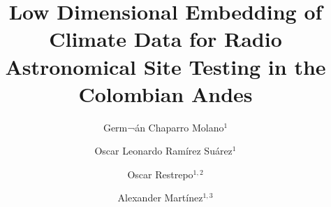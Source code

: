 \documentclass[12pt]{iopart}
\begin{document}

\title[Low Dimensional Embedding of Climate Data for Radio Astronomical Site Testing]{Low Dimensional Embedding of Climate Data for Radio Astronomical Site Testing in the Colombian Andes}

\author{Germ¬\'an Chaparro Molano$^{1}$}
\address{$^1$Grupo de Simulaci\'on, An\'alisis y Modelado, Vicerrector\'ia de Investigaci\'on, Universidad ECCI, Bogot\'a, Colombia}
\author{Oscar Leonardo Ram\'irez Su\'arez$^{1}$}
\address{$^1$Grupo de Simulaci\'on, An\'alisis y Modelado, Vicerrector\'ia de Investigaci\'on, Universidad ECCI, Bogot\'a, Colombia}
\author{Oscar Restrepo$^{1,2}$}
\address{$^1$Grupo de Simulaci\'on, An\'alisis y Modelado, Vicerrector\'ia de Investigaci\'on, Universidad ECCI, Bogot\'a, Colombia}
\address{$^2$Radio Astronomy Instrumentation Group, Universidad de Chile, Santiago de Chile, Chile}
\author{Alexander Mart\'inez$^{1,3}$}
\address{$^1$Grupo de Simulaci\'on, An\'alisis y Modelado, Vicerrector\'ia de Investigaci\'on, Universidad ECCI, Bogot\'a, Colombia}
\address{$^3$Instituto de Hidrolog\'ia, Meteorolog\'ia y Estudios Ambientales, Bogot\'a, Colombia}
\vspace{10pt}
\begin{indented}
\item[]
\end{indented}
\end{document}
